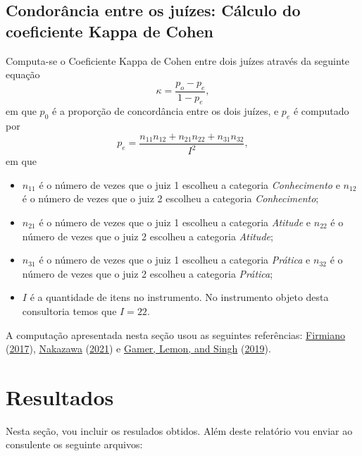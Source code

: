 \documentclass[
]{article}
\providecommand{\tightlist}{%
  \setlength{\itemsep}{0pt}\setlength{\parskip}{0pt}}
\begin{document}
\hypertarget{condoruxe2ncia-entre-os-juuxedzes-cuxe1lculo-do-coeficiente-kappa-de-cohen}{%
\subsection{Condorância entre os juízes: Cálculo do coeficiente Kappa de Cohen}\label{condoruxe2ncia-entre-os-juuxedzes-cuxe1lculo-do-coeficiente-kappa-de-cohen}}

Computa-se o Coeficiente Kappa de Cohen entre dois juízes através da seguinte equação
\[
\kappa = \frac{p_o - p_e}{1 - p_e},
\]
em que \(p_0\) é a proporção de concordância entre os dois juízes, e \(p_e\) é computado por
\[
p_e = \frac{n_{11}n_{12} + n_{21}n_{22} + n_{31}n_{32}}{I^2},
\]
em que

\begin{itemize}
\tightlist
\item
  \(n_{11}\) é o número de vezes que o juiz 1 escolheu a categoria \emph{Conhecimento} e \(n_{12}\) é o número de vezes que o juiz 2 escolheu a categoria \emph{Conhecimento};
\item
  \(n_{21}\) é o número de vezes que o juiz 1 escolheu a categoria \emph{Atitude} e \(n_{22}\) é o número de vezes que o juiz 2 escolheu a categoria \emph{Atitude};
\item
  \(n_{31}\) é o número de vezes que o juiz 1 escolheu a categoria \emph{Prática} e \(n_{32}\) é o número de vezes que o juiz 2 escolheu a categoria \emph{Prática};
\item
  \(I\) é a quantidade de itens no instrumento. No instrumento objeto desta consultoria temos que \(I=22\).
\end{itemize}

A computação apresentada nesta seção usou as seguintes referências: \protect\hyperlink{ref-firmiano2017escala}{Firmiano} (\protect\hyperlink{ref-firmiano2017escala}{2017}), \protect\hyperlink{ref-fmsb2021package}{Nakazawa} (\protect\hyperlink{ref-fmsb2021package}{2021}) e \protect\hyperlink{ref-irr2019package}{Gamer, Lemon, and Singh} (\protect\hyperlink{ref-irr2019package}{2019}).

\newpage

\hypertarget{resultados}{%
\section{Resultados}\label{resultados}}

Nesta seção, vou incluir os resulados obtidos. Além deste relatório vou enviar ao consulente os seguinte arquivos:
\end{document}
